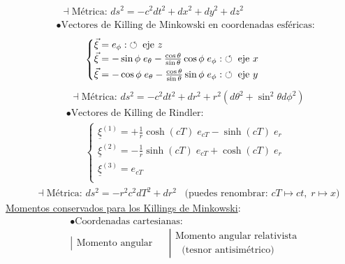 \vspace{-2pt}
\begin{align*}
    &\hspace{5pt}\dashv \text{Métrica: }ds^2 =-c^2 dt^2 + dx^2 +dy^2 +dz^2 \\
    &\bullet \text{Vectores de Killing de Minkowski en coordenadas esféricas:}
\end{align*}
\begin{align*}
&\begin{cases} 
\vec{\xi}=e_\phi: \; \circlearrowleft \; \text{eje }z\\
\vec{\xi}=-\sin\phi\;  e_\theta-\frac{\cos\theta}{\sin\theta}\cos\phi \; e_\phi:\; \circlearrowleft \; \text{eje }x\vspace{2pt}\\
\vec{\xi}=-\cos\phi\;  e_\theta-\frac{\cos\theta}{\sin\theta}\sin\phi \; e_\phi:\; \circlearrowleft \; \text{eje }y
\end{cases}
\end{align*}
\vspace{-3pt}
\begin{align*}
    &\hspace{5pt}\dashv \text{Métrica: }ds^2 =-c^2 dt^2 + dr^2 +r^2(d\theta^2 +\sin^2 \theta d\phi^2)  \\
    &\bullet \text{Vectores de Killing de Rindler:}
\end{align*}
\begin{align*}
&\begin{cases} 
    \underline{\xi}^{(1)}=+\frac{1}{r}\cosh (cT )\; e_{cT}-\sinh(cT)\;e_r\\
\underline{\xi}^{(2)}=-\frac{1}{r}\sinh (cT)\; e_{cT}+\cosh(cT)\;e_r\\
\underline{\xi}^{(3)}=e_{cT}\\
\end{cases}
\end{align*}
\vspace{-3pt}
\begin{align*}
        &\hspace{5pt}\dashv \text{Métrica: }ds^2 =-r^2 c^2 dT^2 +dr^2\; \; \; \text{(puedes renombrar: } cT\mapsto ct, \;r\mapsto x) 
\end{align*}
\underline{Momentos conservados para los Killings de Minkowski}:
\begin{align*}
&\bullet\text{Coordenadas cartesianas:}\\
&    \left|
\begin{array}{l}
\text{Momento angular}
\end{array}
\right.
\hspace{15pt}
 \left|
\begin{array}{l}
\text{Momento angular relativista}\\
\hspace{8pt}\text{(tesnor antisimétrico)}
\end{array}
\right.
\end{align*}
